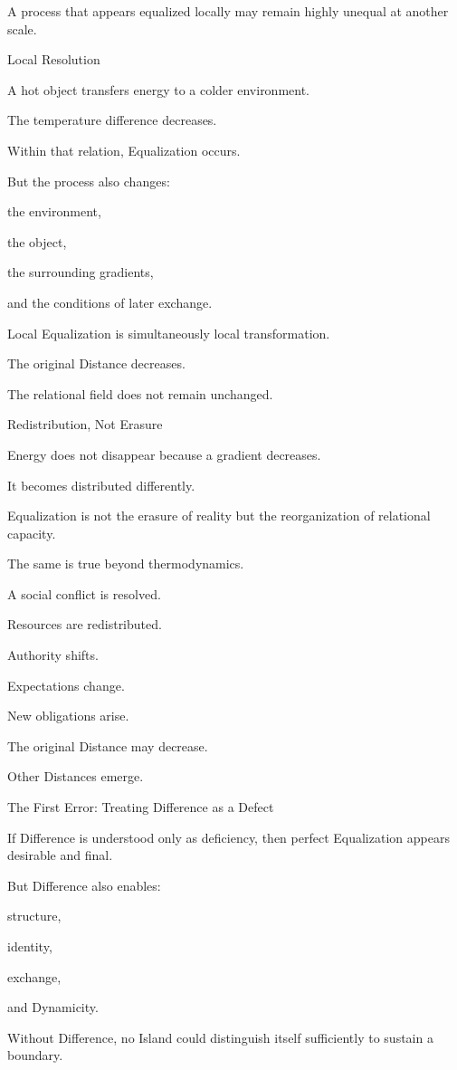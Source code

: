 A process that appears equalized locally may remain highly unequal at another scale.

Local Resolution

A hot object transfers energy to a colder environment.

The temperature difference decreases.

Within that relation, Equalization occurs.

But the process also changes:

the environment,

the object,

the surrounding gradients,

and the conditions of later exchange.

Local Equalization is simultaneously local transformation.

The original Distance decreases.

The relational field does not remain unchanged.

Redistribution, Not Erasure

Energy does not disappear because a gradient decreases.

It becomes distributed differently.

Equalization is not the erasure of reality but the reorganization of relational capacity.

The same is true beyond thermodynamics.

A social conflict is resolved.

Resources are redistributed.

Authority shifts.

Expectations change.

New obligations arise.

The original Distance may decrease.

Other Distances emerge.

The First Error: Treating Difference as a Defect

If Difference is understood only as deficiency, then perfect Equalization appears desirable and final.

But Difference also enables:

structure,

identity,

exchange,

and Dynamicity.

Without Difference, no Island could distinguish itself sufficiently to sustain a boundary.

